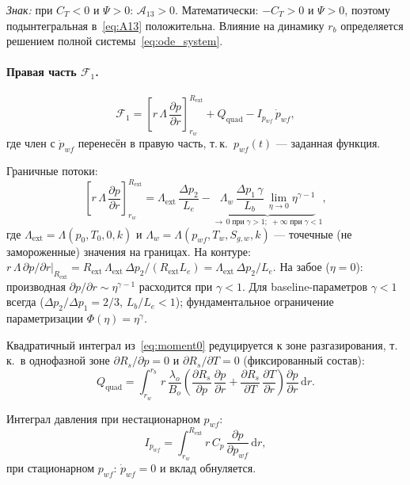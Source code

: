 \documentclass[12pt,a4paper]{article}
\newcommand{\dd}{\mathrm{d}}
\newcommand{\pp}{\partial}
\newcommand{\ext}{\mathrm{ext}}
\begin{document}
\emph{Знак:} при $C_T < 0$ и $\Psi > 0$: $\mathcal{A}_{13} > 0$.
Математически: $-C_T > 0$ и $\Psi > 0$, поэтому
подынтегральная в~\eqref{eq:A13} положительна.
Влияние на динамику $r_b$ определяется
решением полной системы~\eqref{eq:ode_system}.

\paragraph{Правая часть $\mathcal{F}_1$.}
\begin{equation}\label{eq:F1}
  \boxed{
    \mathcal{F}_1
    = \left[r\,\Lambda\,\frac{\pp p}{\pp r}\right]_{r_w}^{R_\ext}
    + Q_\text{quad}
    - I_{p_{wf}}\,\dot{p}_{wf},
  }
\end{equation}
где член с $\dot{p}_{wf}$ перенесён в правую часть,
т.\,к.\ $p_{wf}(t)$ --- заданная функция.

Граничные потоки:
\begin{equation}\label{eq:boundary_fluxes}
  \left[r\,\Lambda\,\frac{\pp p}{\pp r}\right]_{r_w}^{R_\ext}
  = \Lambda_\ext\,\frac{\Delta p_2}{L_e}
    - \underbrace{
      \Lambda_w\,\frac{\Delta p_1\,\gamma}
      {L_b}\,\lim_{\eta\to 0}\eta^{\gamma-1}
    }_{\to\,0\;\text{при}\;\gamma > 1;\;
      +\infty\;\text{при}\;\gamma < 1},
\end{equation}
где $\Lambda_\ext = \Lambda(p_0, T_0, 0, k)$ и
$\Lambda_w = \Lambda(p_{wf}, T_w, S_{g,w}, k)$ ---
точечные (не замороженные) значения на границах.
На контуре: $r\,\Lambda\,\pp p/\pp r\big|_{R_\ext}
= R_\ext\,\Lambda_\ext\,\Delta p_2/(R_\ext L_e)
= \Lambda_\ext\,\Delta p_2/L_e$.
На забое ($\eta = 0$): производная $\pp p/\pp r \sim \eta^{\gamma-1}$
расходится при $\gamma < 1$. Для baseline-параметров
$\gamma < 1$ всегда ($\Delta p_2/\Delta p_1 = 2/3$,
$L_b/L_e < 1$); фундаментальное ограничение параметризации
$\Phi(\eta) = \eta^\gamma$.

Квадратичный интеграл из~\eqref{eq:moment0}
редуцируется к зоне разгазирования, т.\,к.\ в однофазной зоне
$\pp R_s/\pp p = 0$ и $\pp R_s/\pp T = 0$ (фиксированный состав):
\begin{equation}\label{eq:Q_quad}
  Q_\text{quad}
  = \int_{r_w}^{r_b} r\,\frac{\lambda_o}{B_o}\!\left(
      \frac{\pp R_s}{\pp p}\,\frac{\pp p}{\pp r}
      + \frac{\pp R_s}{\pp T}\,\frac{\pp T}{\pp r}
    \right)\frac{\pp p}{\pp r}\,\dd r.
\end{equation}

Интеграл давления при нестационарном $p_{wf}$:
\begin{equation}\label{eq:I_pwf}
  I_{p_{wf}} = \int_{r_w}^{R_\ext} r\,C_p\,
    \frac{\pp p}{\pp p_{wf}}\,\dd r,
\end{equation}
при стационарном $p_{wf}$: $\dot{p}_{wf} = 0$ и вклад
обнуляется.
\end{document}
